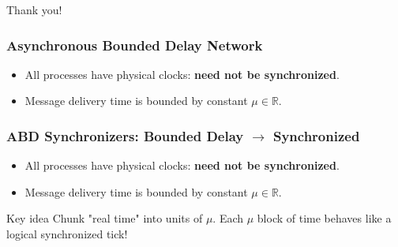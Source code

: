 \documentclass{beamer}
\begin{document}
\begin{frame}
    Thank you!
\end{frame}

\begin{frame}
    \frametitle{Asynchronous Bounded Delay Network}
    \begin{itemize}
    \item All processes have physical clocks: \textbf{need not be synchronized}.
    \item Message delivery time is bounded by constant $\mu \in \mathbb R$.
    \end{itemize}
\end{frame}

\begin{frame}
    \frametitle{ABD Synchronizers: Bounded Delay $\rightarrow$ Synchronized}
    \begin{itemize}
    \item All processes have physical clocks: \textbf{need not be synchronized}.
    \item Message delivery time is bounded by constant $\mu \in \mathbb R$.
    \end{itemize}

    \begin{block}{Key idea}
        Chunk "real time" into units of $\mu$. Each $\mu$ block of time
        behaves like a logical synchronized tick!
    \end{block}
\end{frame}

\begin{frame}
\end{frame}

\begin{frame}
\end{frame}
\end{document}
